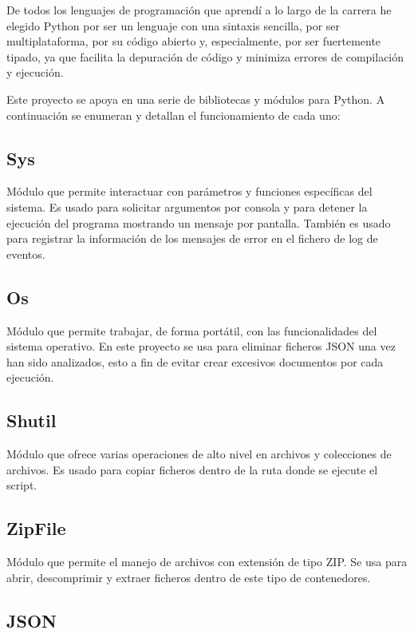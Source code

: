 \documentclass[a4paper, 12pt]{book}
\begin{document}
De todos los lenguajes de programación que aprendí a lo largo de la carrera he elegido Python por ser un lenguaje con una sintaxis sencilla, por ser multiplataforma, por su código abierto y, especialmente, por ser fuertemente tipado, ya que facilita la depuración de código y minimiza errores de compilación y ejecución.

Este proyecto se apoya en una serie de bibliotecas y módulos para Python. A continuación se enumeran y detallan el funcionamiento de cada uno:

\subsection{Sys}
\label{sec:sys}

Módulo que permite interactuar con parámetros y funciones específicas del sistema. Es usado para solicitar argumentos por consola y para detener la ejecución del programa mostrando un mensaje por pantalla. También es usado para registrar la información de los mensajes de error en el fichero de log de eventos.

\subsection{Os} 
\label{sec:os}

Módulo que permite trabajar, de forma portátil, con las funcionalidades del sistema operativo. En este proyecto se usa para eliminar ficheros JSON una vez han sido analizados, esto a fin de evitar crear excesivos documentos por cada ejecución.

\subsection{Shutil}
\label{sec:shutil}

Módulo que ofrece varias operaciones de alto nivel en archivos y colecciones de archivos. Es usado para copiar ficheros dentro de la ruta donde se ejecute el script.

\subsection{ZipFile}
\label{sec:zipfile}

Módulo que permite el manejo de archivos con extensión de tipo ZIP. Se usa para abrir, descomprimir y extraer ficheros dentro de este tipo de contenedores.

\subsection{JSON}
\label{sec:jsonmodule}
\end{document}
